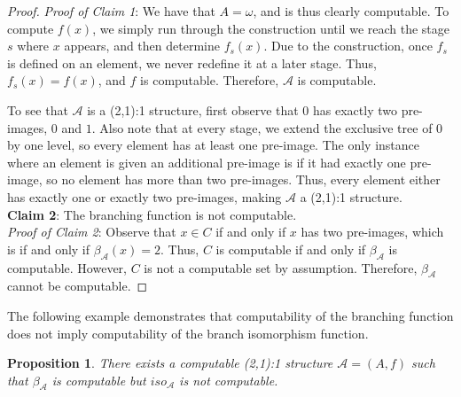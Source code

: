 \documentclass[12pt]{article}
\newtheorem{prop}[thm]{Proposition}
\begin{document}
\begin{proof}
\emph{Proof of Claim 1}: We have that $A=\omega$, and is thus clearly computable. To compute $f(x)$, we simply run through the construction until we reach the stage $s$ where $x$ appears, and then determine $f_s(x)$. Due to the construction, once $f_s$ is defined on an element, we never redefine it at a later stage. Thus, $f_s(x)=f(x)$, and $f$ is computable. Therefore, $\mathcal{A}$ is computable.

To see that $\mathcal{A}$ is a (2,1):1 structure, first observe that $0$ has exactly two pre-images, $0$ and $1$. Also note that at every stage, we extend the exclusive tree of $0$ by one level, so every element has at least one pre-image. The only instance where an element is given an additional pre-image is if it had exactly one pre-image, so no element has more than two pre-images. Thus, every element either has exactly one or exactly two pre-images, making $\mathcal{A}$ a (2,1):1 structure.\\

\textbf{Claim 2}: The branching function is not computable.\\

\emph{Proof of Claim 2}: Observe that $x \in C$ if and only if $x$ has two pre-images, which is if and only if $\beta_\mathcal{A}(x)=2$. Thus, $C$ is computable if and only if $\beta_\mathcal{A}$ is computable. However, $C$ is not a computable set by assumption. Therefore, $\beta_\mathcal{A}$ cannot be computable.
\end{proof}


The following example demonstrates that computability of the branching function does not imply computability of the branch isomorphism function.

\begin{prop}
There exists a computable (2,1):1 structure $\mathcal{A}=(A,f)$ such that $\beta_\mathcal{A}$ is computable but $iso_\mathcal{A}$ is not computable.
\end{prop}
\end{document}
